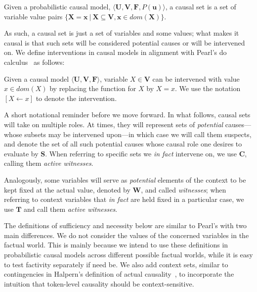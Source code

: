 \documentclass[anon,12pt]{clear2025} %
\begin{document}
\begin{definition}
    Given a probabilistic causal model, \linebreak  \(\langle \mathbf{U}, \mathbf{V}, \mathbf{F}, P(\mathbf{u})\rangle\), a causal set is a set of variable value pairs \(\{\mathbf{X} = \mathbf{x} ~|~ \mathbf{X} \subseteq  \mathbf{V}, \mathbf{x} \in \mathit{dom}(\mathbf{X})\}\). 
\end{definition}
\noindent As such, a causal set is just a set of variables and some values; what makes it causal is that such sets will be considered potential causes or will be intervened on. 
We define interventions in causal models in alignment with Pearl's do calculus~\cite{causalityPearl}  as follows:

\begin{definition}[Interventions]
    Given a causal model \(\langle \mathbf{U}, \mathbf{V}, \mathbf{F} \rangle\), variable \(X \in \mathbf{V}\) can be intervened with value \(x \in \textit{dom}(X)\) by replacing the function for \(X\) by \(X = x\). We use the notation \([X \leftarrow x]\) to denote the intervention.
\end{definition}

\noindent A short notational reminder before we move forward. In what follows, causal sets will take on multiple roles. At times, they will represent sets of \emph{potential} causes---whose subsets may be intervened upon---in which case we will call them suspects, and denote the set of all such potential causes whose causal role one desires to evaluate by $\mathbf{S}$. When referring to specific sets we \emph{in fact} intervene on, we use $\mathbf{C}$, calling them \emph{active witnesses}.

Analogously, some variables will serve as \emph{potential} elements of the context to be kept fixed at the actual value, denoted by $\mathbf{W}$, and called \emph{witnesses};  when referring to context variables that \emph{in fact} are held fixed in a particular case, we use $\mathbf{T}$ and call them \emph{active witnesses}.


The definitions of sufficiency and necessity below are similar to Pearl's with two main differences. We do not consider the values of the concerned variables in the factual world. This is mainly because we intend to use these definitions in probabilistic causal models across different possible factual worlds, while it is easy to test factivity separately if need be. We also add context sets,  similar to contingencies in Halpern's definition of actual causality~\cite{actualCausalityHalpern}, to incorporate the intuition that token-level causality should be context-sensitive.
\end{document}

